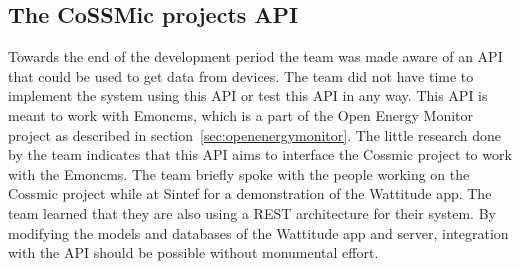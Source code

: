 \subsection{The CoSSMic projects API}
\label{sec:cossmicapi}
Towards the end of the development period the team was made aware of an API that could be used to get data from devices. The team did not have time to implement the system using this API or test this API in any way. This API is meant to work with Emoncms, which is a part of the Open Energy Monitor project as described in section~\ref{sec:openenergymonitor}. The little research done by the team indicates that this API aims to interface the Cossmic project to work with the Emoncms. The team briefly spoke with the people working on the Cossmic project while at Sintef for a demonstration of the Wattitude app. The team learned that they are also using a REST architecture for their system. By modifying the models and databases of the Wattitude app and server, integration with the API should be possible without monumental effort.